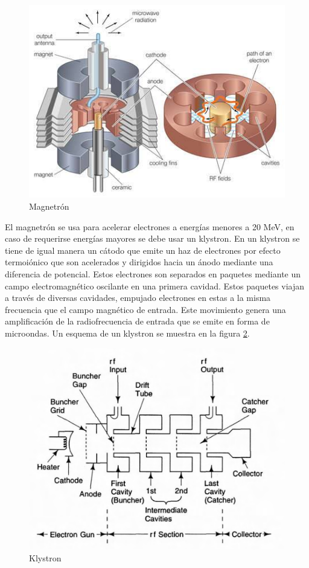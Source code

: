 \begin{figure}[H]
	\centering
	\includegraphics[width=0.7\linewidth]{images/magnetron.jpg}
	\caption{Magnetrón\cite{magne}}
	\label{fig:magnetron}
\end{figure}

El magnetrón se usa para acelerar electrones a energías menores a 20 MeV, en caso de requerirse energías mayores se debe usar un klystron. En un klystron se tiene de igual manera un cátodo que emite un haz de electrones por efecto termoiónico que son acelerados y dirigidos hacia un ánodo mediante una diferencia de potencial. Estos electrones son separados en paquetes mediante un campo electromagnético oscilante en una primera cavidad. Estos paquetes viajan a través de diversas cavidades, empujado electrones en estas a la misma frecuencia que el campo magnético de entrada. Este movimiento genera una amplificación de la radiofrecuencia de entrada que se emite en forma de microondas. Un esquema de un klystron se muestra en la figura \ref{fig:klystron}.\\

\begin{figure}[H]
	\centering
	\includegraphics[width=0.7\linewidth]{images/klystron.png}
	\caption{Klystron\cite{karzmark1993medical}}
	\label{fig:klystron}
\end{figure}

